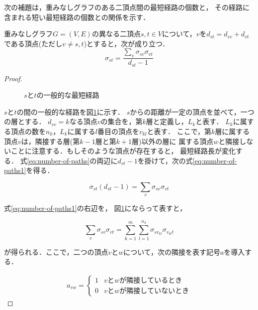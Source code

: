 次の補題は，重みなしグラフのある二頂点間の最短経路の個数と，
その経路に含まれる短い最短経路の個数との関係を示す．
\begin{lemma}
  \label{lemma:number-of-paths}
  重みなしグラフ$G=(V,E)$の異なる二頂点$s,t\in V$について，$v$を$d_{st}=d_{sv}+d_{vt}$
  である頂点(ただし$v\neq s,t$)とすると，次が成り立つ．
  \begin{equation}
    \label{eq:number-of-paths}
    \sigma_{st}=\frac{\sum_{v}\sigma_{sv}\sigma_{vt}}{d_{st}-1}
  \end{equation}
\end{lemma}
\begin{proof}
  \begin{figure}
    \centering
    \def\svgwidth{.5\columnwidth}
    
    \caption{$s$と$t$の一般的な最短経路}
    \label{fig:proof-number-of-paths}
  \end{figure}
  $s$と$t$の間の一般的な経路を図\ref{fig:proof-number-of-paths}に示す．
  $s$からの距離が一定の頂点を並べて，一つの層とする．
  $d_{sv}=k$なる頂点$v$の集合を，第$k$層と定義し，$L_k$と表す．
  $L_k$に属する頂点の数を$n_k$，$L_k$に属する$l$番目の頂点を$v_{kl}$と表す．
  ここで，第$k$層に属する頂点$v$は，隣接する層(第$k-1$層と第$k+1$層)以外の層に
  属する頂点$w$と隣接しないことに注意する．もしそのような頂点が存在すると，
  最短経路長が変化する．
  式\eqref{eq:number-of-paths}の両辺に$d_{st}-1$を掛けて，次の式\eqref{eq:number-of-paths1}を得る．

  \begin{equation}
    \sigma_{st}(d_{st}-1)=\sum_{v}\sigma_{sv}\sigma_{vt}
    \label{eq:number-of-paths1}
  \end{equation}

  式\eqref{eq:number-of-paths1}の右辺を，
  図\ref{fig:proof-number-of-paths}にならって表すと，

  \begin{equation}
    \sum_{v}\sigma_{sv}\sigma_{vt}=
    \sum_{k=1}^m\sum_{l=1}^{n_k}\sigma_{sv_{kl}}\sigma_{v_{kl}t}
    \label{eq:number-of-paths2}
  \end{equation}

  が得られる．ここで，二つの頂点$v$と$w$について，次の隣接を表す記号$a$を導入する．

  \begin{align*}
    a_{vw}=
    \begin{cases}
      1 & vとwが隣接しているとき \\
      0 & vとwが隣接していないとき
    \end{cases}
  \end{align*}


\end{proof}

